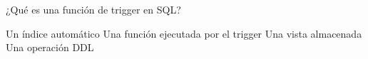 \question[1] ¿Qué es una función de trigger en SQL?
\begin{choices}
\choice Un índice automático
\CorrectChoice Una función ejecutada por el trigger
\choice Una vista almacenada
\choice Una operación DDL
\end{choices}